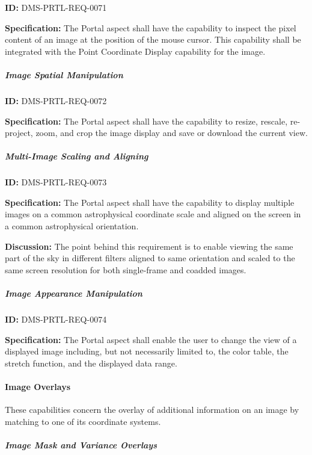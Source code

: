 \documentclass[SE,toc]{lsstdoc}
\begin{document}
\label{DMS-PRTL-REQ-0071}
\textbf{ID:} DMS-PRTL-REQ-0071

\textbf{Specification:}
The Portal aspect shall have the capability to inspect the pixel content of an image at the position of the mouse cursor.  This capability shall be integrated with the Point Coordinate Display capability for the image.

\subparagraph{Image Spatial Manipulation}\hfill  %

\label{DMS-PRTL-REQ-0072}
\textbf{ID:} DMS-PRTL-REQ-0072

\textbf{Specification:}
The Portal aspect shall have the capability to resize, rescale, re-project, zoom, and crop the image display and save or download the current view.

\subparagraph{Multi-Image Scaling and Aligning}\hfill  %

\label{DMS-PRTL-REQ-0073}
\textbf{ID:} DMS-PRTL-REQ-0073

\textbf{Specification:}
The Portal aspect shall have the capability to display multiple images on a common astrophysical coordinate scale and aligned on the screen in a common astrophysical orientation.

\textbf{Discussion:}
The point behind this requirement is to enable viewing the same part of the sky in different filters aligned to same orientation and scaled to the same screen resolution for both single-frame and coadded images.

\subparagraph{Image Appearance Manipulation}\hfill  %

\label{DMS-PRTL-REQ-0074}
\textbf{ID:} DMS-PRTL-REQ-0074

\textbf{Specification:}
The Portal aspect shall enable the user to change the view of a displayed image including, but not necessarily limited to, the color table, the stretch function, and the displayed data range.

\paragraph{Image Overlays}\hfill  %

These capabilities concern the overlay of additional information on an image by matching to one of its coordinate systems.

\subparagraph{Image Mask and Variance Overlays}\hfill  %
\end{document}
